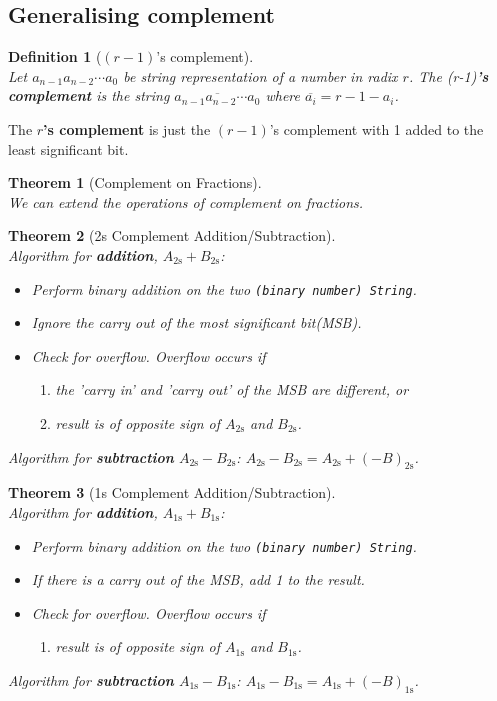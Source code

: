\documentclass[12pt]{article}
\newtheorem{definition}{Definition}[section]
\newtheorem{theorem}{Theorem}[section]
\theoremstyle{definition}
\begin{document}
\subsection{Generalising complement}
\begin{definition}[$(r-1)$'s complement]
\hfill\\\normalfont Let $a_{n-1}a_{n-2}\cdots a_{0}$ be string representation of a number in radix $r$. The (r-1)\textbf{'s complement} is the string $\overline{a_{n-1}a_{n-2}\cdots a_{0}}$ where $\overline{a_{i}}=r-1-a_{i}$.
\end{definition}
The $r$\textbf{'s complement} is just the $(r-1)$'s complement with 1 added to the least significant bit.
\begin{theorem}[Complement on Fractions]
\hfill\\\normalfont We can extend the operations of complement on fractions.
\end{theorem}
\begin{theorem}[2s Complement Addition/Subtraction]
\hfill\\\normalfont Algorithm for \textbf{addition}, $A_\text{2s}+B_\text{2s}$:
\begin{itemize}
  \item Perform binary addition on the two \texttt{(binary number) String}.
  \item Ignore the carry out of the most significant bit(MSB).
  \item Check for overflow. Overflow occurs if
  \begin{enumerate}
    \item the 'carry in' and 'carry out' of the MSB are different, or
    \item result is of opposite sign of $A_\text{2s}$ and $B_\text{2s}$.
  \end{enumerate}
\end{itemize}
Algorithm for \textbf{subtraction} $A_\text{2s}-B_\text{2s}$: $A_\text{2s}-B_\text{2s}=A_\text{2s}+(-B)_\text{2s}$.
\end{theorem}
\begin{theorem}[1s Complement Addition/Subtraction]
\hfill\\\normalfont Algorithm for \textbf{addition}, $A_\text{1s}+B_\text{1s}$:
\begin{itemize}
  \item Perform binary addition on the two \texttt{(binary number) String}.
  \item If there is a carry out of the MSB, add 1 to the result.
  \item Check for overflow. Overflow occurs if
  \begin{enumerate}
      \item result is of opposite sign of $A_\text{1s}$ and $B_\text{1s}$.
  \end{enumerate}
\end{itemize}
Algorithm for \textbf{subtraction} $A_\text{1s}-B_\text{1s}$: $A_\text{1s}-B_\text{1s}=A_\text{1s}+(-B)_\text{1s}$.
\end{theorem}
\end{document}
